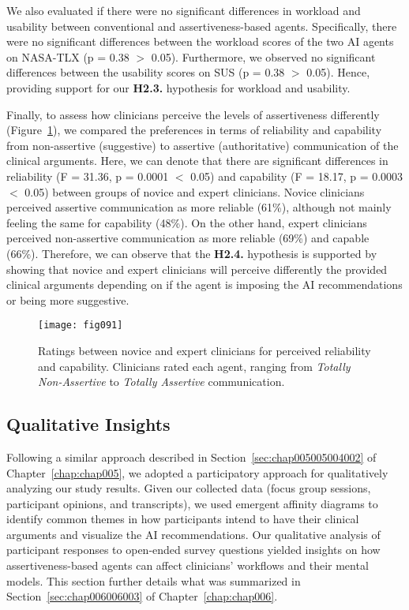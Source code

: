 We also evaluated if there were no significant differences in workload and usability between conventional and assertiveness-based agents.
Specifically, there were no significant differences between the workload scores of the two \ac{AI} agents on \ac{NASA-TLX} (p = 0.38 $>$ 0.05).
Furthermore, we observed no significant differences between the usability scores on \ac{SUS} (p = 0.38 $>$ 0.05).
Hence, providing support for our {\bf H2.3.} hypothesis for workload and usability.



Finally, to assess how clinicians perceive the levels of assertiveness differently (Figure~\ref{fig:fig091}), we compared the preferences in terms of reliability and capability from non-assertive (suggestive) to assertive (authoritative) communication of the clinical arguments.
Here, we can denote that there are significant differences in reliability (F = 31.36, p = 0.0001 $<$ 0.05) and capability (F = 18.17, p = 0.0003 $<$ 0.05) between groups of novice and expert clinicians.
Novice clinicians perceived assertive communication as more reliable (61\%), although not mainly feeling the same for capability (48\%).
On the other hand, expert clinicians perceived non-assertive communication as more reliable (69\%) and capable (66\%).
Therefore, we can observe that the {\bf H2.4.} hypothesis is supported by showing that novice and expert clinicians will perceive differently the provided clinical arguments depending on if the agent is imposing the \ac{AI} recommendations or being more suggestive.

\begin{figure}[htpb]
\centering
\texttt{[image: fig091]}
\caption[]{Ratings between novice and expert clinicians for perceived reliability and capability. Clinicians rated each agent, ranging from {\it Totally Non-Assertive} to {\it Totally Assertive} communication.}
\label{fig:fig091}
\end{figure}

\subsection{Qualitative Insights}
\label{sec:app005007003}

Following a similar approach described in Section~\ref{sec:chap005005004002} of Chapter~\ref{chap:chap005}, we adopted a participatory approach for qualitatively analyzing our study results.
Given our collected data (focus group sessions, participant opinions, and transcripts), we used emergent affinity diagrams to identify common themes in how participants intend to have their clinical arguments and visualize the \ac{AI} recommendations.
Our qualitative analysis of participant responses to open-ended survey questions yielded insights on how assertiveness-based agents can affect clinicians’ workflows and their mental models.
This section further details what was summarized in Section~\ref{sec:chap006006003} of Chapter~\ref{chap:chap006}.

